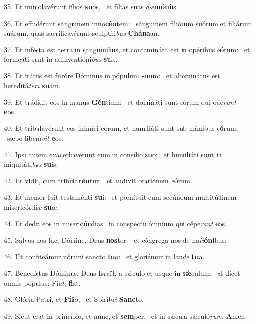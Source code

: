 35. Et immolavérunt fílios \textbf{su}os, \ast\  et fílias suas \textit{dæ}\textbf{mó}\textbf{ni}is.\

36. Et effudérunt sánguinem inno\textbf{cén}tem: \ast\  sánguinem filiórum suórum et filiárum suárum, quas sacrificavérunt sculptíli\textit{bus} \textbf{Chá}\textbf{na}an.\

37. Et infécta est terra in sanguínibus, et contamináta est in opéribus e\textbf{ó}rum: \ast\  et fornicáti sunt in adinventióni\textit{bus} \textbf{su}is.\

38. Et irátus est furóre Dóminus in pópulum \textbf{su}um: \ast\  et abominátus est hereditá\textit{tem} \textbf{su}am.\

39. Et trádidit eos in manus \textbf{Gén}tium: \ast\  et domináti sunt eórum qui odé\textit{runt} \textbf{e}os.\

40. Et tribulavérunt eos inimíci eórum, et humiliáti sunt sub mánibus e\textbf{ó}rum: \ast\  sæpe liberá\textit{vit} \textbf{e}os.\

41. Ipsi autem exacerbavérunt eum in consílio \textbf{su}o: \ast\  et humiliáti sunt in iniquitáti\textit{bus} \textbf{su}is.\

42. Et vidit, cum tribula\textbf{rén}tur: \ast\  et audívit oratiónem \textit{e}\textbf{ó}rum.\

43. Et memor fuit testaménti \textbf{su}i: \ast\  et pœnítuit eum secúndum multitúdinem misericórdi\textit{æ} \textbf{su}æ.\

44. Et dedit eos in miseri\textbf{cór}dias \ast\  in conspéctu ómnium qui cépe\textit{rant} \textbf{e}os.\

45. Salvos nos fac, Dómine, Deus \textbf{nos}ter: \ast\  et cóngrega nos de na\textit{ti}\textbf{ó}\textbf{ni}bus:\

46. Ut confiteámur nómini sancto \textbf{tu}o: \ast\  et gloriémur in lau\textit{de} \textbf{tu}a.\

47. Benedíctus Dóminus, Deus Israël, a sǽculo et usque in \textbf{sǽ}culum: \ast\  et dicet omnis pópulus: Fi\textit{at}, \textbf{fi}at.\

48. Glória Patri, et \textbf{Fí}lio, \ast\  et Spirítu\textit{i} \textbf{Sanc}to.\

49. Sicut erat in princípio, et nunc, et \textbf{sem}per, \ast\  et in sǽcula sæculó\textit{rum}. \textbf{A}men.\

